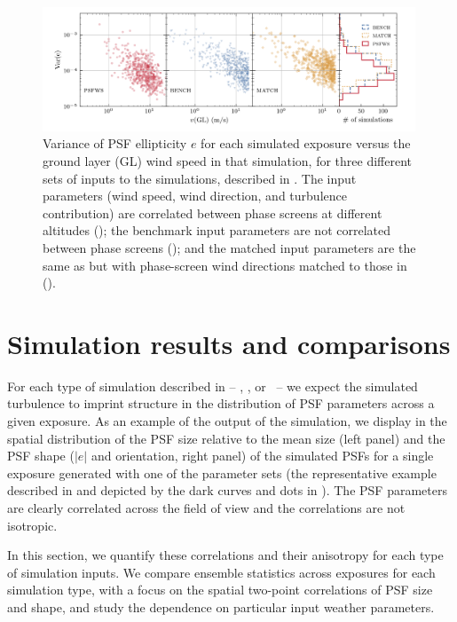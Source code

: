 \documentclass[twocolumn]{aastex631}
\begin{document}
\begin{figure}
\includegraphics[width=0.99\textwidth]{f4_evar_speed.png}
    \caption{Variance of PSF ellipticity $e$ for each simulated exposure versus the ground layer (GL) wind speed in that simulation, for three different sets of inputs to the simulations, described in .  
    The \psfws input parameters (wind speed, wind direction, and turbulence contribution) are correlated between phase screens at different altitudes (\psfwssims);
    the benchmark input parameters are not correlated between phase screens (\bench); 
    and the matched input parameters are the same as \bench but with phase-screen wind directions matched to those in \psfws (\match). 
    \label{fig:paramvar}
    }
\end{figure}

\section{Simulation results and comparisons} \label{sec:imsimresults}

For each type of simulation described in  -- \psfwssims, \match, or \bench\ -- we expect the simulated turbulence to imprint structure in the distribution of PSF parameters across a given exposure. 
As an example of the output of the \psfwssims simulation, we display in  the spatial distribution of the PSF size relative to the mean size (left panel) and the PSF shape ($|e|$ and orientation, right panel) of the simulated PSFs for a single exposure generated with one of the \psfwssims parameter sets (the representative example described in  and depicted by the dark curves and dots in ). 
The PSF parameters are clearly correlated across the field of view and the correlations are not isotropic. 


In this section, we quantify these correlations and their anisotropy for each type of simulation inputs. 
We compare ensemble statistics across exposures for each simulation type, with a focus on the spatial two-point correlations of PSF size and shape, and study the dependence on particular input weather parameters.
\end{document}
